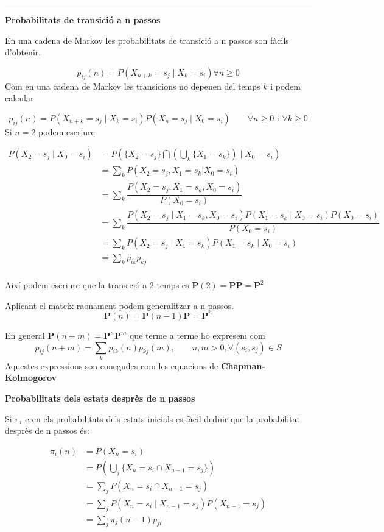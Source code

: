 \documentclass[
  catalan,
]{article}
\theoremstyle{definition}
\theoremstyle{definition}
\theoremstyle{definition}
\theoremstyle{definition}
\theoremstyle{remark}
\begin{document}
\begin{center}\rule{0.5\linewidth}{0.5pt}\end{center}

\textbf{Probabilitats de transició a n passos}

En una cadena de Markov les probabilitats de transició a n passos son fàcils d'obtenir.

\[
p_{ij}(n) =P(X_{n+k}= s_j \mid X_k=s_i) \forall n\geq0
\]
Com en una cadena de Markov les transicions no depenen del temps \(k\) i podem calcular

\[
p_{ij}(n) =P(X_{n+k}= s_j \mid X_k=s_i)P(X_{n}= s_j \mid X_0=s_i) \qquad \forall n\geq0 \text{ i } \forall k \geq 0
\]
Si \(n=2\) podem escriure

\[
\begin{aligned}
P(X_2=s_j\mid X_0=s_i) & = P\left(\{X_2=s_j\} \bigcap \left (\bigcup_k  \{X_1=s_k\}\right)\mid X_0=s_i \right) \\
                      &=\sum_k P(X_2=s_j,X_1=s_k|X_0=s_i) \\
                      &= \sum_k \dfrac {P(X_2=s_j,X_1=s_k,X_0=s_i)}{P(X_0=s_i)} \\
                      &= \sum_k \dfrac {P(X_2=s_j \mid X_1=s_k,X_0=s_i) P( X_1=s_k \mid X_0=s_i) P(X_0=s_i)}  {P(X_0=s_i)} \\
                      &= \sum_k P(X_2=s_j \mid X_1=s_k) P( X_1=s_k \mid X_0=s_i) \\
                      &=  \sum_k p_{ik}p_{kj} \\
\end{aligned}
\]

Així podem escriure que la transició a 2 temps es \(\textbf{P}(2)=\textbf{P} \textbf{P}=\textbf{P}^2\)

Aplicant el mateix raonament podem generalitzar a n passos.
\[
\textbf{P}(n)=\textbf{P}(n-1) \textbf{P}=\textbf{P}^n   \label{eq:ptranspn}
\]

En general \(\textbf{P}(n+m)=\textbf{P}^n\textbf{P}^m\) que terme a terme ho expresem com
\[
p_{ij}(n+m)=\sum_k p_{ik}(n)p_{kj}(m), \qquad n,m>0, \forall (s_i,s_j)   \in S   \label{eq:chapman}
\]
Aquestes expressions son conegudes com les equacions de \textbf{Chapman-Kolmogorov}

\textbf{Probabilitats dels estats desprès de n passos}

Si \(\pi_i\) eren els probabilitats dels estats inicials es fàcil deduir que la probabilitat desprès de n passos és:

\[
\begin{aligned}
\pi_i(n) &= P(X_n = s_i) \\
&= P\left(\bigcup_j \{X_n = s_i \cap X_{n-1} = s_j\}\right) \\
&= \sum_j P(X_n = s_i \cap X_{n-1} = s_j) \\
&= \sum_j P(X_n = s_i \mid X_{n-1} = s_j) P(X_{n-1} = s_j) \\
&= \sum_j \pi_j(n-1) p_{ji}
\end{aligned}
\]
\end{document}
